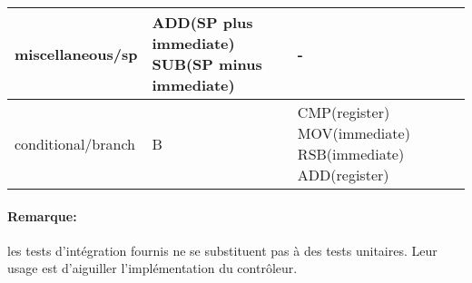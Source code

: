 \documentclass{article}
\begin{document}
\begin{tabularx}{\textwidth}{|l|X|X|}
        \hline
        miscellaneous/sp                               & ADD(SP plus immediate) \newline SUB(SP minus immediate)                                                                           & -                                                                                    \\
        \hline
        conditional/branch                             & B                                                                                                                                 & CMP(register) \newline MOV(immediate) \newline RSB(immediate) \newline ADD(register) \\
        \hline
    \end{tabularx}

    \paragraph{Remarque:} les tests d'intégration fournis ne se substituent pas à des tests unitaires.
    Leur usage est d'aiguiller l'implémentation du contrôleur.
\end{document}
